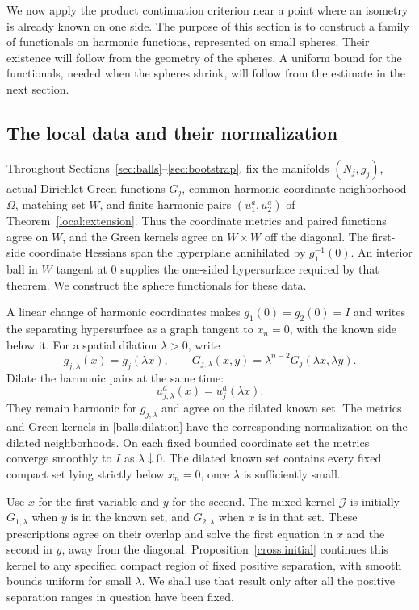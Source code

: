 \documentclass[11pt]{article}
\theoremstyle{definition}
\theoremstyle{remark}
\numberwithin{equation}{section}
\begin{document}
We now apply the product continuation criterion near a point where an
isometry is already known on one side.  The purpose of this section is to
construct a family of functionals on harmonic functions, represented on
small spheres.  Their existence will follow from the geometry of the
spheres.  A uniform bound for the functionals, needed when the spheres
shrink, will follow from the estimate in the next section.

\subsection{The local data and their normalization}
\label{balls:setup}

Throughout Sections~\ref{sec:balls}--\ref{sec:bootstrap}, fix the
manifolds $(N_j,g_j)$, actual Dirichlet Green functions $G_j$, common
harmonic coordinate neighborhood $\Omega$, matching set $W$, and finite
harmonic pairs $(u_1^a,u_2^a)$ of Theorem~\ref{local:extension}.
Thus the coordinate metrics and paired functions agree on $W$, and the
Green kernels agree on $W\times W$ off the diagonal. The first-side
coordinate Hessians span the hyperplane annihilated by $g_1^{-1}(0)$. An interior ball in
$W$ tangent at $0$ supplies the one-sided hypersurface required by
that theorem. We construct the sphere functionals for these data.

A linear change of harmonic coordinates makes $g_1(0)=g_2(0)=I$ and
writes the separating hypersurface as a graph tangent to $x_n=0$, with
the known side below it.  For a spatial
dilation $\lambda>0$, write
\begin{equation}\label{balls:dilation}
 g_{j,\lambda}(x)=g_j(\lambda x),\qquad
 G_{j,\lambda}(x,y)=\lambda^{n-2}G_j(\lambda x,\lambda y).
\end{equation}
Dilate the harmonic pairs at the same time:
\[
 u_{j,\lambda}^a(x)=u_j^a(\lambda x).
\]
They remain harmonic for $g_{j,\lambda}$ and agree on the dilated known
set. The metrics and Green kernels in \eqref{balls:dilation} have the
corresponding normalization on the dilated neighborhoods. On each fixed
bounded coordinate set the metrics converge smoothly to $I$ as $\lambda\downarrow0$.  The dilated known set
contains every fixed compact set lying strictly below $x_n=0$, once
$\lambda$ is sufficiently small.

Use $x$ for the first variable and $y$ for the second.  The mixed kernel
$\mathcal G$ is initially $G_{1,\lambda}$ when $y$ is in the known set,
and $G_{2,\lambda}$ when $x$ is in that set.  These prescriptions agree on
their overlap and solve the first equation in $x$ and the second in $y$,
away from the diagonal.  Proposition~\ref{cross:initial} continues this
kernel to any specified compact region of fixed positive separation,
with smooth bounds uniform for small $\lambda$.  We shall use that result
only after all the positive separation ranges in question have been fixed.
\end{document}
